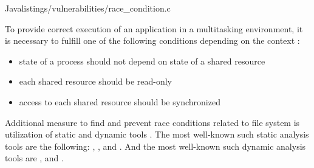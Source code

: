 {}
	{Java}{listings/vulnerabilities/race_condition.c}

%
To provide correct execution of an application in a multitasking environment, it is necessary to fulfill one of the following conditions depending on the context  : 
\begin{itemize}
	\item \A state of a process should not depend on \A state of a shared resource
	\item each shared resource should be read-only
	\item access to each shared resource should be synchronized
\end{itemize}

%
Additional measure to find and prevent race conditions related to file system is utilization of static and dynamic tools . 
%
The most well-known such static analysis tools are the following:  ,  , and  .
%
And the most well-known such dynamic analysis tools are  , and  . 